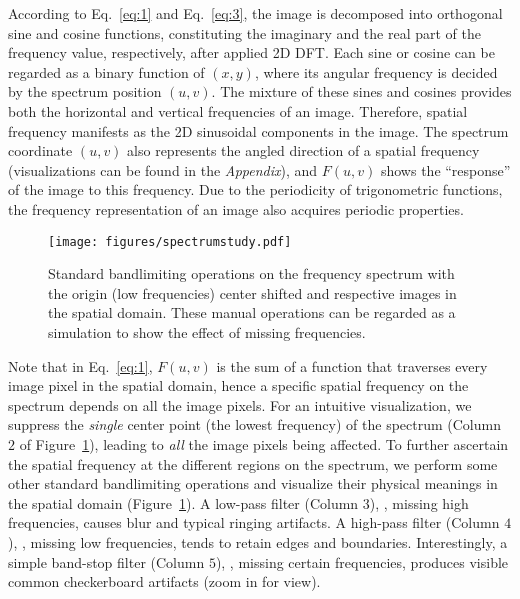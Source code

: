 \documentclass[10pt,twocolumn,letterpaper]{article}
\begin{document}
According to Eq.~\eqref{eq:1} and Eq.~\eqref{eq:3}, the image is decomposed into orthogonal sine and cosine functions, constituting the imaginary and the real part of the frequency value, respectively, after applied 2D DFT.
Each sine or cosine can be regarded as a binary function of $\left(x, y\right)$, where its angular frequency is decided by the spectrum position $\left(u, v\right)$.
The mixture of these sines and cosines provides both the horizontal and vertical frequencies of an image.
Therefore, spatial frequency manifests as the 2D sinusoidal components in the image.
The spectrum coordinate $\left(u, v\right)$ also represents the angled direction of a spatial frequency (visualizations can be found in the \textit{Appendix}), and $F\left(u, v\right)$ shows the ``response'' of the image to this frequency.
Due to the periodicity of trigonometric functions, the frequency representation of an image also acquires periodic properties.


\begin{figure}[t]
	\centering
\texttt{[image: figures/spectrumstudy.pdf]}
\caption{Standard bandlimiting operations on the frequency spectrum with the origin (low frequencies) center shifted and respective images in the spatial domain. These manual operations can be regarded as a simulation to show the effect of missing frequencies.}
	\label{fig:spectrumstudy}
	\vspace{-0.35cm}
\end{figure}


Note that in Eq.~\eqref{eq:1}, $F\left(u,v\right)$ is the sum of a function that traverses every image pixel in the spatial domain, hence a specific spatial frequency on the spectrum depends on all the image pixels.
For an intuitive visualization, we suppress the \textit{single} center point (the lowest frequency) of the spectrum (Column $2$ of Figure~\ref{fig:spectrumstudy}), leading to \textit{all} the image pixels being affected.
To further ascertain the spatial frequency at the different regions on the spectrum, we perform some other standard bandlimiting operations and visualize their physical meanings in the spatial domain (Figure~\ref{fig:spectrumstudy}).
A low-pass filter (Column $3$), \ie, missing high frequencies, causes blur and typical ringing artifacts. A high-pass filter (Column $4$), \ie, missing low frequencies, tends to retain edges and boundaries. Interestingly, a simple band-stop filter (Column $5$), \ie, missing certain frequencies, produces visible common checkerboard artifacts (zoom in for view).
\end{document}
